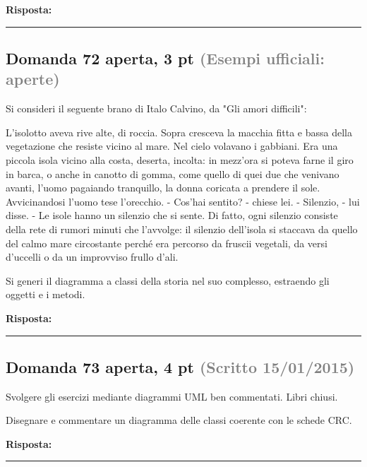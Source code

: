 \documentclass[a4paper,11pt]{article}
\begin{document}
\vspace{0.2cm}
\noindent\textbf{Risposta:}\par
\vspace{4cm}\hrule


\subsection*{Domanda 72 \hfill {\small aperta, 3 pt \textcolor{gray}{(Esempi ufficiali: aperte)}}}
\begin{tcolorbox}[colback=gray!8,colframe=gray!50,title=Contesto]
Si consideri il seguente brano di Italo Calvino, da "Gli amori difficili":

L'isolotto aveva rive alte, di roccia. Sopra cresceva la macchia fitta e bassa della vegetazione che resiste vicino al mare. Nel cielo volavano i gabbiani. Era una piccola isola vicino alla costa, deserta, incolta: in mezz'ora si poteva farne il giro in barca, o anche in canotto di gomma, come quello di quei due che venivano avanti, l'uomo pagaiando tranquillo, la donna coricata a prendere il sole. Avvicinandosi l'uomo tese l'orecchio. - Cos'hai sentito? - chiese lei. - Silenzio, - lui disse. - Le isole hanno un silenzio che si sente. Di fatto, ogni silenzio consiste della rete di rumori minuti che l'avvolge: il silenzio dell'isola si staccava da quello del calmo mare circostante perché era percorso da fruscii vegetali, da versi d'uccelli o da un improvviso frullo d'ali.
\end{tcolorbox}
Si generi il diagramma a classi della storia nel suo complesso, estraendo gli oggetti e i metodi.

\vspace{0.2cm}
\noindent\textbf{Risposta:}\par
\vspace{4cm}\hrule


\subsection*{Domanda 73 \hfill {\small aperta, 4 pt \textcolor{gray}{(Scritto 15/01/2015)}}}
\begin{tcolorbox}[colback=gray!8,colframe=gray!50,title=Contesto]
Svolgere gli esercizi mediante diagrammi UML ben commentati. Libri chiusi.
\end{tcolorbox}
Disegnare e commentare un diagramma delle classi coerente con le schede CRC.

\vspace{0.2cm}
\noindent\textbf{Risposta:}\par
\vspace{4cm}\hrule
\end{document}
